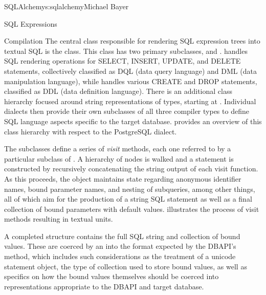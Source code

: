\begin{aosachapter}{SQLAlchemy}{s:sqlalchemy}{Michael Bayer}
\begin{aosasect1}{SQL Expressions}
\begin{aosasect2}{Compilation}
The central class responsible for rendering SQL expression trees into textual
SQL is the  class.  This class has two primary subclasses,  and
.   handles SQL rendering operations for SELECT, INSERT,
UPDATE, and DELETE statements, collectively classified as DQL (data query language) and
DML (data manipulation language), while  handles various CREATE and
DROP statements, classified as DDL (data definition language).
There is an additional class hierarchy focused around
string representations of types, starting at . Individual
dialects then provide their own subclasses of all three compiler types
to define SQL language aspects specific to the target database.
 provides an overview of this class hierarchy with respect to the
PostgreSQL dialect.


The  subclasses define a series of \emph{visit} methods, each
one referred to by a particular subclass of .  A hierarchy
of  nodes is walked and a statement is constructed by
recursively concatenating the string output of each visit function.
As this proceeds, the  object maintains state regarding anonymous identifier names,
bound parameter names, and nesting of subqueries, among other things, all of which
aim for the production of a string SQL statement as well as a final
collection of bound parameters with default values.    illustrates
the process of visit methods resulting in textual units.


A completed  structure contains the full SQL string and
collection of bound values.   These are coerced by an
 into the format expected by the DBAPI's 
method,  which includes such considerations as the treatment of a unicode
statement object, the type of collection used
to store bound values, as well as specifics on how the bound values
themselves should be coerced into representations appropriate to the DBAPI and
target database.

\end{aosasect2}


\end{aosasect1}
\end{aosachapter}
